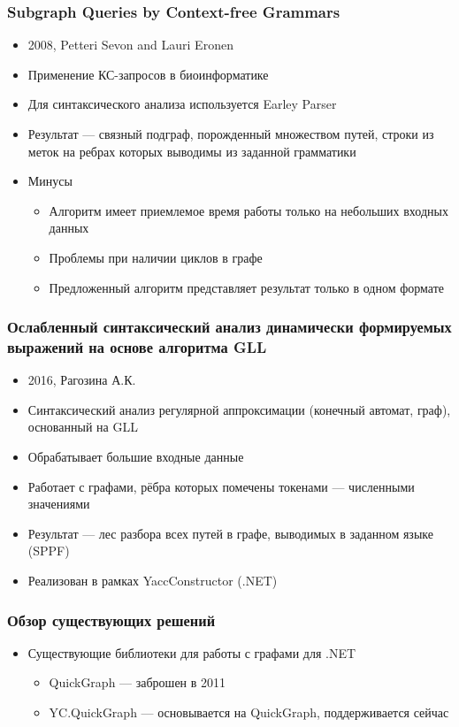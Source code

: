 \documentclass{beamer}
\begin{document}
\begin{frame}
  \transwipe[direction=90]
  \frametitle{Subgraph Queries by Context-free Grammars}
  \begin{itemize}
    \item 2008, Petteri Sevon and Lauri Eronen
    \item Применение КС-запросов в биоинформатике
    \item Для синтаксического анализа используется Earley Parser 
    \item Результат --- связный подграф, порожденный множеством путей, строки из меток на ребрах которых выводимы из заданной грамматики
  \end{itemize}
  
  \begin{itemize}
    \item Минусы
    \begin{itemize}
      \item Алгоритм имеет приемлемое время работы только на небольших входных данных
      \item Проблемы при наличии циклов в графе
      \item Предложенный алгоритм представляет результат только в одном формате
    \end{itemize}
  \end{itemize}
\end{frame}

\begin{frame}
  \transwipe[direction=90]
  \frametitle{Ослабленный синтаксический анализ динамически формируемых выражений на основе алгоритма GLL}
  \begin{itemize}
    \item 2016, Рагозина А.К.
    \item Синтаксический анализ регулярной аппроксимации (конечный автомат, граф), основанный на GLL
    \item Обрабатывает большие входные данные 
    \item Работает с графами, рёбра которых помечены токенами --- численными значениями
    \item Результат --- лес разбора всех путей в графе, выводимых в заданном языке (SPPF)
    \item Реализован в рамках YaccConstructor (.NET)
  \end{itemize}
\end{frame}

\begin{frame}
  \transwipe[direction=90]
  \frametitle{Обзор существующих решений}
  \begin{itemize}
    \item Существующие библиотеки для работы с графами для .NET
    \begin{itemize}
        \item QuickGraph --- заброшен в 2011
        \item YC.QuickGraph --- основывается на QuickGraph, поддерживается сейчас
    \end{itemize}
  \end{itemize}
\end{frame}
\end{document}
